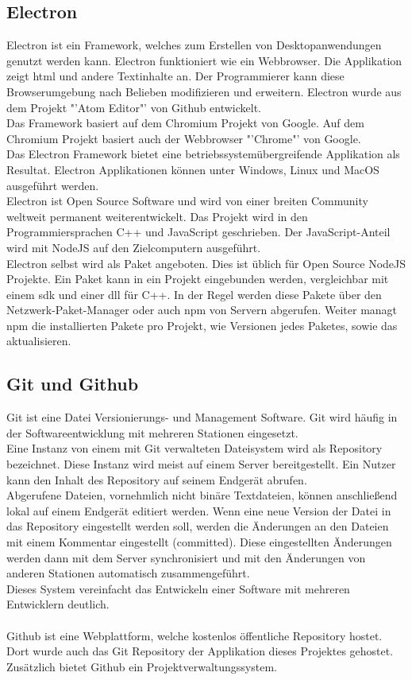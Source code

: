 \documentclass[11pt]{scrartcl}
\begin{document}
\subsection{Electron}
Electron ist ein Framework, welches zum Erstellen von Desktopanwendungen genutzt werden kann. Electron funktioniert
wie ein Webbrowser. Die Applikation zeigt \ac{html} und andere Textinhalte an.\cite{electron} Der Programmierer kann diese
Browserumgebung nach Belieben modifizieren und erweitern. Electron wurde aus dem Projekt "'Atom Editor"' von Github entwickelt.\\
Das Framework basiert auf dem Chromium Projekt von Google. Auf dem Chromium Projekt basiert auch der Webbrowser "'Chrome"' von
Google.\\
Das Electron Framework bietet eine betriebssystemübergreifende Applikation als Resultat. Electron Applikationen können unter
Windows, Linux und MacOS ausgeführt werden.\\
Electron ist Open Source Software und wird von einer breiten Community weltweit permanent weiterentwickelt.\cite{electron} Das Projekt wird
in den Programmiersprachen C++ und JavaScript geschrieben. Der JavaScript-Anteil wird mit NodeJS auf den Zielcomputern ausgeführt.\\
Electron selbst wird als Paket angeboten. Dies ist üblich für Open Source NodeJS Projekte. Ein Paket kann in ein Projekt eingebunden werden,
vergleichbar mit einem \ac{sdk} und einer \ac{dll} für C++. In der Regel werden diese Pakete über den Netzwerk-Paket-Manager oder auch
\ac{npm} von Servern abgerufen. Weiter managt \ac{npm} die installierten Pakete pro Projekt, wie Versionen jedes Paketes, sowie das
aktualisieren.

\subsection{Git und Github}
Git ist eine Datei Versionierungs- und Management Software. Git wird häufig in der Softwareentwicklung mit mehreren Stationen eingesetzt.\\
Eine Instanz von einem mit Git verwalteten Dateisystem wird als Repository bezeichnet. Diese Instanz wird meist auf einem Server
bereitgestellt. Ein Nutzer kann den Inhalt des Repository auf seinem Endgerät abrufen.\\
Abgerufene Dateien, vornehmlich nicht binäre Textdateien, können anschließend lokal auf einem Endgerät editiert werden. Wenn eine neue
Version der Datei in das Repository eingestellt werden soll, werden die Änderungen an den Dateien mit einem Kommentar eingestellt
(committed). Diese eingestellten Änderungen werden dann mit dem Server synchronisiert und mit den Änderungen von anderen Stationen
automatisch zusammengeführt.\\
Dieses System vereinfacht das Entwickeln einer Software mit mehreren Entwicklern deutlich.\\
\\
Github ist eine Webplattform, welche kostenlos öffentliche Repository hostet. Dort wurde auch das Git Repository der Applikation
dieses Projektes gehostet.\\
Zusätzlich bietet Github ein Projektverwaltungssystem.
\clearpage
\end{document}
